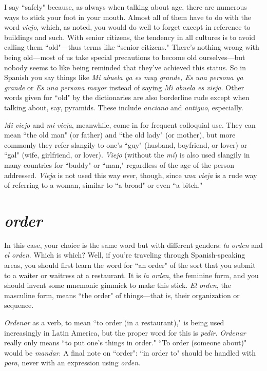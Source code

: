 I say ``safely" because, as always when talking about age, there
are numerous ways to stick your foot in your mouth. Almost all of
them have to do with the word \emph{viejo}, which, as noted, you would do
well to forget except in reference to buildings and such. With senior
citizens, the tendency in all cultures is to avoid calling them ``old"---thus terms like ``senior citizens." There's nothing wrong with being
old---most of us take special precautions to become old ourselves---but
nobody seems to like being reminded that they've achieved this status.
So in Spanish you say things like \emph{Mi abuela ya es muy grande, Es
una persona ya grande} or  \emph{Es una persona mayor} instead of saying \emph{Mi
abuela es vieja}. Other words given for ``old" by the dictionaries are
also borderline rude except when talking about, say, pyramids. These
include \emph{anciano} and \emph{antiguo}, especially.

\emph{Mi viejo} and \emph{mi vieja}, meanwhile, come in for frequent colloquial use. They can mean ``the old man" (or father) and ``the old lady"
(or mother), but more commonly they refer slangily to one's ``guy"
(husband, boyfriend, or lover) or ``gal" (wife, girlfriend, or lover). \emph{Viejo}
(without the \emph{mí}) is also used slangily in many countries for ``buddy" or
``man," regardless of the age of the person addressed. \emph{Vieja} is not used
this way ever, though, since \emph{una vieja} is a rude way of referring to a
woman, similar to ``a broad" or even ``a bitch."

\section{\emph{order}}

In this case, your choice is the same word but with different
genders: \emph{la orden} and \emph{el orden}. Which is which? Well, if you're traveling through Spanish-speaking areas, you should first learn the word for
``an order" of the sort that you submit to a waiter or waitress at a restaurant. It is \emph{la orden}, the feminine form, and you should invent some
mnemonic gimmick to make this stick. \emph{El orden}, the masculine form,
means ``the order" of things---that is, their organization or sequence.

\emph{Ordenar} as a verb, to mean ``to order (in a restaurant)," is being used
increasingly in Latin America, but the proper word for this is \emph{pedir}.
\emph{Ordenar} really only means ``to put one's things in order." ``To order
(someone about)" would be \emph{mandar}. A final note on ``order": ``in order
to" should be handled with \emph{para}, never with an expression using
\emph{orden}.

